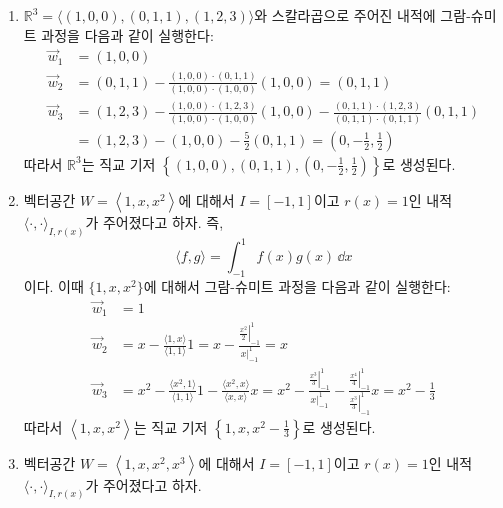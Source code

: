 \documentclass[sections/engineering_mathematics_lecture_note.tex]{subfiles}
\begin{document}
\begin{example}
    \leavevmode
    \begin{enumerate}
        \item $\mathbb R^3 = \langle (1, 0, 0), (0, 1, 1), (1, 2, 3) \rangle$와 스칼라곱으로 주어진 내적에 그람-슈미트 과정을 다음과 같이 실행한다:
            \begin{align*}
                \vec w_1 &= (1, 0, 0)\\
                \vec w_2 &= (0, 1, 1) - \frac{(1, 0, 0) \cdot (0, 1, 1)}{(1, 0, 0) \cdot (1, 0, 0)} (1, 0, 0) = (0, 1, 1)\\
                \vec w_3 &= (1, 2, 3) - \frac{(1, 0, 0) \cdot (1, 2, 3)}{(1, 0, 0) \cdot (1, 0, 0)}(1, 0, 0) - \frac{(0, 1, 1) \cdot (1, 2, 3)}{(0, 1, 1) \cdot (0, 1, 1)}(0, 1, 1)\\
                         &= (1, 2, 3) - (1, 0, 0) - \frac 52 (0, 1, 1) = \left(0, -\frac 12, \frac 12\right)
            \end{align*}
            따라서 $\mathbb R^3$는 직교 기저 $\left\{(1, 0, 0), (0, 1, 1), \left(0, -\frac12, \frac12\right)\right\}$로 생성된다.
        \item 벡터공간 $W = \left< 1, x, x^2 \right>$에 대해서 $I = [-1, 1]$이고 $r(x) = 1$인 내적 $\langle \cdot, \cdot \rangle_{I, r(x)}$가 주어졌다고 하자.
            즉,
            \begin{equation*}
                \langle f, g \rangle = \int_{-1}^1 f(x) g(x)\,\dd x
            \end{equation*}
            이다.
            이때 $\{1, x, x^2\}$에 대해서 그람-슈미트 과정을 다음과 같이 실행한다:
            \begin{align*}
                \vec w_1 &= 1\\
                \vec w_2 &= x - \frac{\langle 1, x \rangle}{\langle 1, 1\rangle} 1 = x - \frac{\left. \frac{x^2}{2}\right|_{-1}^1}{\left. x\right|_{-1}^1} = x\\
                \vec w_3 &= x^2 - \frac{\langle x^2, 1 \rangle}{\langle 1, 1\rangle} 1 - \frac{\langle x^2, x\rangle}{\langle x, x \rangle} x = x^2 - \frac{\left.\frac{x^3}{3}\right|_{-1}^1}{\left. x \right|_{-1}^1} - \frac{\left. \frac{x^4}{4} \right|_{-1}^1}{\left. \frac{x^3}{3} \right|_{-1}^1} x = x^2 - \frac13
            \end{align*}
            따라서 $\left< 1, x, x^2 \right>$는 직교 기저 $\left\{1, x, x^2 - \frac13\right\}$로 생성된다.
        \item 벡터공간 $W = \left< 1, x, x^2, x^3 \right>$에 대해서 $I = [-1, 1]$이고 $r(x) = 1$인 내적 $\langle \cdot, \cdot \rangle_{I, r(x)}$가 주어졌다고 하자.

\end{enumerate}
\end{example}
\end{document}
